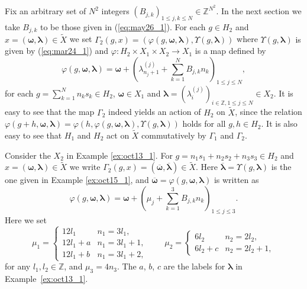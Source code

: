 \documentclass[pdftex]{sigma}
\newcommand{\Z}{{\mathbb Z}}
\newcommand\bom{\boldsymbol{\omega}}
\newcommand\bol{\boldsymbol{\lambda}}
\begin{document}
Fix an arbitrary set of $N^2$ integers $(B_{j,k})_{1 \leq j,k \leq N} \in \Z^{N^2}$.
In the next section we take $B_{j,k}$ to be those given in (\ref{eq:may26_1}).
For each $g \in H_2$ and $x =(\bom,\bol) \in \tilde{X}$
we set
$\varGamma_2(g, x) = (\varphi (g, \bom, \bol), \Upsilon (g,\bol))$ where
{$\Upsilon (g,\bol)$ is given by (\ref{eq:mar24_1}) and
$\varphi : H_2 \times X_1 \times X_2 \rightarrow X_1$ is a map def\/ined by
\begin{equation}\label{eq:oct19_2}
\varphi (g, \bom, \bol) = \bom +
\left(  \lambda^{(j)}_{n_j+1} + \sum_{k=1}^N B_{j,k} n_k \right)_{1 \leq j \leq N},
\end{equation}
for each $g = \sum_{k=1}^N n_k s_k \in H_2$,
$\bom \in X_1$ and
$\bol = (\lambda^{(j)}_i)_{i \in \Z, 1 \leq j \leq N} \in X_2$.}
It is easy to see that
the map $\varGamma_2$ indeed yields an action of $H_2$ on $\tilde{X}$, since
the relation $\varphi (g + h, \bom, \bol) =
\varphi (h, \varphi(g, \bom, \bol) , \Upsilon (g,\bol))$ holds for all $g,h \in H_2$.
It is also easy to see that
$H_1$ and $H_2$ act on $\tilde{X}$ commutatively by $\varGamma_1$ and $\varGamma_2$.
%
\begin{example}\label{ex:oct15_3}
Consider the $X_2$ in Example \ref{ex:oct13_1}.
%
For $g = n_1 s_1 + n_2 s_2 + n_3 s_3 \in H_2$ and
$x =(\bom,\bol) \in \tilde{X}$
we write $\varGamma_2(g, x) =(\overline{\bom}, \overline{\bol}) \in \tilde{X}$.
Here $\overline{\bol} = \Upsilon (g , \bol)$ is the one given in Example \ref{ex:oct15_1}, and
$\overline{\bom} = \varphi (g, \bom, \bol)$ is written as
\begin{displaymath}
\varphi (g, \bom, \bol) = \bom +
\left( \mu_j + \sum_{k=1}^3 B_{j,k} n_k \right) _{1 \leq j \leq 3}.
\end{displaymath}
Here we set
\begin{equation*}
\mu_1 =
\begin{cases}
12 l_1 & n_1 = 3 l_1,\\
12 l_1 + a & n_1 = 3 l_1+1,\\
12 l_1 + b & n_1 = 3 l_1+2,
\end{cases}
\qquad
\mu_2 =
\begin{cases}
6 l_2 & n_2 = 2 l_2,\\
6 l_2 + c & n_2 = 2 l_2 + 1,
\end{cases}
\end{equation*}
for any $l_1, l_2 \in \Z$, and $\mu_3 = 4 n_3$.
The $a$, $b$, $c$ are the labels for $\bol$ in Example~\ref{ex:oct13_1}.
\end{example}
\end{document}
